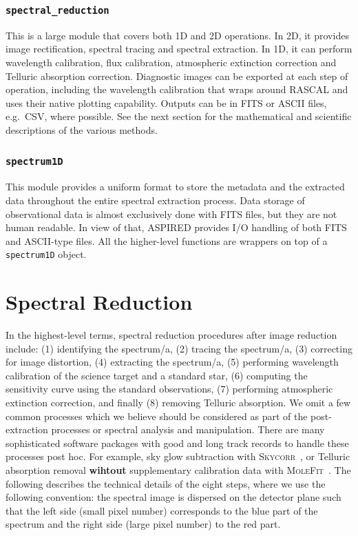 \documentclass[fleqn,usenatbib]{mnras}
\begin{document}
\subsubsection{\texttt{spectral\_reduction}}
This is a large module that covers both 1D and 2D operations. In 2D, it
provides image rectification, spectral tracing and spectral extraction.
In 1D, it can perform wavelength calibration, flux calibration, atmospheric
extinction correction and Telluric absorption correction. Diagnostic images
can be exported at each step of operation, including the wavelength calibration
that wraps around \textsc{RASCAL} and uses their native plotting capability.
Outputs can be in FITS or ASCII files, e.g.\ CSV, where possible. See the next
section for the mathematical and scientific descriptions of the various methods.

\subsubsection{\texttt{spectrum1D}}
This module provides a uniform format to store the metadata
and the extracted data throughout the entire spectral extraction process.
Data storage of observational data is almost exclusively done with FITS files,
but they are not human readable. In view of that, \textsc{ASPIRED} provides I/O handling
of both FITS and ASCII-type files. All the higher-level functions are wrappers on
top of a \texttt{spectrum1D} object.

\section{Spectral Reduction}
In the highest-level terms, spectral reduction procedures after image
reduction include: (1) identifying the spectrum/a, (2) tracing the
spectrum/a, (3) correcting for image distortion, (4) extracting the
spectrum/a, (5) performing wavelength calibration of the science target and a
standard star, (6) computing the sensitivity curve using the standard
observations, (7) performing atmospheric extinction correction,
and finally (8) removing Telluric absorption. We omit a few common
processes which we believe should be considered as part of the
post-extraction processes or spectral analysis and manipulation.
There are many sophisticated software packages with good and long track records
to handle these processes post hoc. For example, sky glow subtraction
with \textsc{Skycorr}~\citep{2014A&A...567A..25N}, or Telluric
absorption removal \textbf{wihtout} supplementary calibration data with
\textsc{MoleFit}~\citep{2015A&A...576A..77S, 2015A&A...576A..78K}.
The following describes the technical details of the eight steps,
where we use the following convention: the spectral image is dispersed
on the detector plane such that the left side (small pixel number) corresponds to
the blue part of the spectrum and the right side (large pixel number) to the red part.
\end{document}
